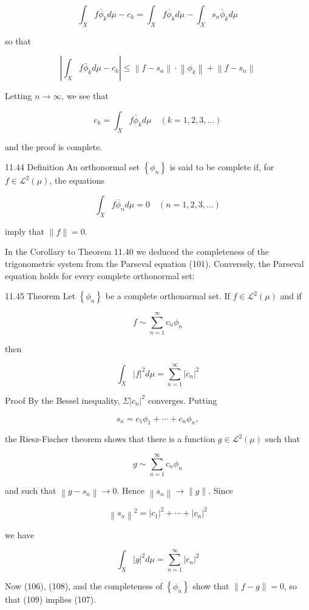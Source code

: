 \documentclass[10pt]{article}
\begin{document}
$$
\int_{X} f \bar{\phi}_{k} d \mu-c_{k}=\int_{X} f \bar{\phi}_{k} d \mu-\int_{X} s_{n} \bar{\phi}_{k} d \mu
$$

so that

$$
\left|\int_{X} f \bar{\phi}_{k} d \mu-c_{k}\right| \leq\left\|f-s_{n}\right\| \cdot\left\|\phi_{k}\right\|+\left\|f-s_{n}\right\|
$$

Letting $n \rightarrow \infty$, we see that

$$
c_{k}=\int_{X} f \bar{\phi}_{k} d \mu \quad(k=1,2,3, \ldots)
$$

and the proof is complete.

11.44 Definition An orthonormal set $\left\{\phi_{n}\right\}$ is said to be complete if, for $f \in \mathscr{L}^{2}(\mu)$, the equations

$$
\int_{X} f \bar{\phi}_{n} d \mu=0 \quad(n=1,2,3, \ldots)
$$

imply that $\|f\|=0$.

In the Corollary to Theorem 11.40 we deduced the completeness of the trigonometric system from the Parseval equation (101). Conversely, the Parseval equation holds for every complete orthonormal set:

11.45 Theorem Let $\left\{\phi_{n}\right\}$ be a complete orthonormal set. If $f \in \mathscr{L}^{2}(\mu)$ and if

$$
f \sim \sum_{n=1}^{\infty} c_{n} \phi_{n}
$$

then

$$
\int_{X}|f|^{2} d \mu=\sum_{n=1}^{\infty}\left|c_{n}\right|^{2}
$$

Proof By the Bessel inequality, $\Sigma\left|c_{n}\right|^{2}$ converges. Putting

$$
s_{n}=c_{1} \phi_{1}+\cdots+c_{n} \phi_{n},
$$

the Riesz-Fischer theorem shows that there is a function $g \in \mathscr{L}^{2}(\mu)$ such that

$$
g \sim \sum_{n=1}^{\infty} c_{n} \phi_{n}
$$

and such that $\left\|g-s_{n}\right\| \rightarrow 0$. Hence $\left\|s_{n}\right\| \rightarrow\|g\|$. Since

$$
\left\|s_{n}\right\|^{2}=\left|c_{1}\right|^{2}+\cdots+\left|c_{n}\right|^{2}
$$

we have

$$
\int_{X}|g|^{2} d \mu=\sum_{n=1}^{\infty}\left|c_{n}\right|^{2}
$$

Now (106), (108), and the completeness of $\left\{\phi_{n}\right\}$ show that $\|f-g\|=0$, so that (109) implies (107).
\end{document}
